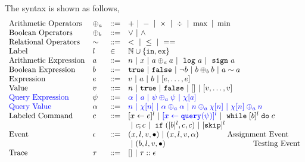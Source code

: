 The syntax is shown as follows,
\[
\begin{array}{llll}
\mbox{Arithmetic Operators} 
& \oplus_a & ::= & + ~|~ - ~|~ \times 
%
~|~ \div ~|~ \max ~|~ \min\\  
\mbox{Boolean Operators} 
& \oplus_b & ::= & \lor ~|~ \land
\\
%
\mbox{Relational Operators} 
& \sim & ::= & < ~|~ \leq ~|~ == 
\\  
%
\mbox{Label} 
& l & \in & \mathbb{N} \cup \{\lin, \lex\} 
\\ 
%
\mbox{Arithmetic Expression} 
& \aexpr & ::= & 
n ~|~ {x} ~|~ \aexpr \oplus_a \aexpr  
 ~|~ \elog \aexpr  ~|~ \esign \aexpr
\\
%
\mbox{Boolean Expression} & \bexpr & ::= & 
%
\etrue ~|~ \efalse  ~|~ \neg \bexpr
 ~|~ \bexpr \oplus_b \bexpr
%
~|~ \aexpr \sim \aexpr 
\\
%
\mbox{Expression} & \expr & ::= & v ~|~ \aexpr ~|~ \bexpr ~|~ [\expr, \dots, \expr]
\\  
%
\mbox{Value} 
& v & ::= & { n ~|~ \etrue ~|~ \efalse ~|~ [] ~|~ [v, \dots, v]}  
\\
%
\highlight{\mbox{Query Expression}  }
& {\qexpr} & ::= 
& \highlight{ \qval ~|~ \aexpr ~|~ \qexpr \oplus_a \qexpr ~|~ \chi[\aexpr]}
\\
%
\highlight{\mbox{Query Value} }& \qval & ::= 
& \highlight{n ~|~ \chi[n] ~|~ \qval \oplus_a  \qval ~|~ n \oplus_a  \chi[n]
    ~|~ \chi[n] \oplus_a  n}
    \\
\mbox{Labeled Command} 
& {c} & ::= &   [\assign {{x}}{ {\expr}}]^{l} ~|~  \highlight{[\assign {{x} } {{\query(\qexpr)}}]^{l}}
~|~ {\ewhile [ \bexpr ]^{l} \edo {c} }
\\
&&&
~|~ {c};{c}  
~|~ \eif([\bexpr]{}^l , {c}, {c}) 
~|~ [\eskip]^l
\\ 
\mbox{Event} 
& \event & ::= & 
    ({x}, l, v, \bullet) ~|~ ({x}, l, v, \qval)  ~~~~~~~~~~~ \mbox{Assignment Event} \\
&&& ~|~(\bexpr, l, v, \bullet)   ~~~~~~~~~~~~~~~~~~~~~~~~~~~~~~~~~~ \mbox{Testing Event}
\\
\mbox{Trace} & \trace
& ::= & [] ~|~ \trace :: \event
\\
\end{array}
\]
